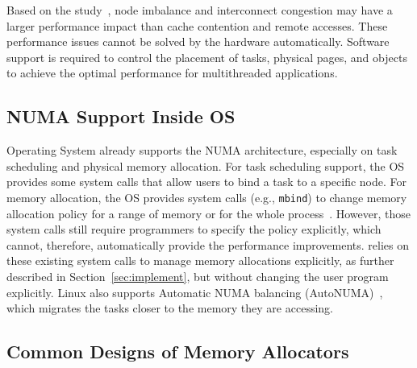 


Based on the study~\cite{Blagodurov:2011:CNC:2002181.2002182}, node imbalance and interconnect congestion may have a larger performance impact than cache contention and remote accesses. These performance issues cannot be solved by the hardware automatically. Software support is required to control the placement of tasks, physical pages, and objects to achieve the optimal performance for multithreaded applications.  

\subsection{NUMA Support Inside OS} 

Operating System already supports the NUMA architecture, especially on task scheduling and physical memory allocation. For task scheduling support, the OS provides some system calls that allow users to bind a task to a specific node. For memory allocation, the OS provides system calls (e.g., \texttt{mbind}) to change memory allocation policy for a range of memory or for the whole process~\cite{lameter2013numa, diener2015locality}. However, those system calls still require programmers to specify the policy explicitly, which cannot, therefore, automatically provide the performance improvements. \NM{} relies on these existing system calls to manage memory allocations explicitly, as further described in Section~\ref{sec:implement}, but without changing the user program explicitly. Linux also supports Automatic NUMA balancing (AutoNUMA)~\cite{AutoNUMA1}, which migrates the tasks closer to the memory they are accessing. 

\subsection{Common Designs of Memory Allocators}
\label{sec:commondesign}


